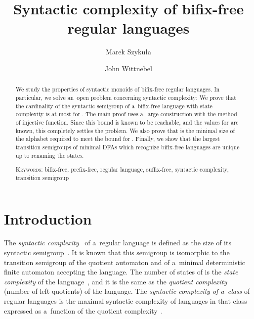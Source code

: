 \documentclass{amsart}
\newcommand{\noin}{\noindent}
\begin{document}
\title{Syntactic complexity of bifix-free regular languages}
\author{Marek Szyku{\l}a}
\address{Institute of Computer Science, University of Wroc{\l}aw,\\
Joliot-Curie 15, PL-50-383 Wroc{\l}aw, Poland}
\author{John Wittnebel}
\address{David R. Cheriton School of Computer Science, University of Waterloo,\\
Waterloo, ON, Canada N2L 3G1}

\begin{abstract}
We study the properties of syntactic monoids of bifix-free regular languages.
In particular, we solve an~open problem concerning syntactic complexity:
We prove that the cardinality of the syntactic semigroup of a~bifix-free language with state complexity  is at most  for .
The main proof uses a~large construction with the method of injective function.
Since this bound is known to be reachable, and the values for  are known, this completely settles the problem.
We also prove that  is the minimal size of the alphabet required to meet the bound for .
Finally, we show that the largest transition semigroups of minimal DFAs which recognize bifix-free languages are unique up to renaming the states.

\medskip\noin
{\textsc{Keywords:}} bifix-free, prefix-free, regular language, suffix-free, syntactic complexity, transition semigroup
\end{abstract}

\maketitle
\section{Introduction}

The \emph{syntactic complexity}~\cite{BrYe11}  of a~regular language  is defined as the size of its syntactic semigroup~\cite{Pin97}.
It is known that this semigroup is isomorphic to the transition semigroup of the quotient automaton  and of a~minimal deterministic finite automaton accepting the language.
The number  of states of  is the \emph{state complexity} of the language~\cite{Yu01}, and it is the same as the \emph{quotient complexity}~\cite{Brz10} (number of left quotients) of the language.
The \emph{syntactic complexity of a~class} of regular languages is the maximal syntactic complexity of languages in that class expressed as a~function of the quotient complexity~.
\end{document}
